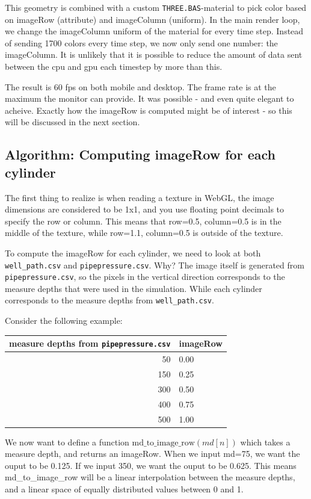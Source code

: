 This geometry is combined with a custom \texttt{THREE.BAS}-material to
pick color based on imageRow (attribute) and imageColumn (uniform). In
the main render loop, we change the imageColumn uniform of the material
for every time step. Instead of sending 1700 colors every time step, we
now only send one number: the imageColumn. It is unlikely that it is
possible to reduce the amount of data sent between the cpu and gpu each
timestep by more than this.

The result is 60 fps on both mobile and desktop. The frame rate is at
the maximum the monitor can provide. It was possible - and even quite
elegant to acheive. Exactly how the imageRow is computed might be of
interest - so this will be discussed in the next section.

\hypertarget{algorithm-computing-imagerow-for-each-cylinder}{%
\subsection{Algorithm: Computing imageRow for each
cylinder}\label{algorithm-computing-imagerow-for-each-cylinder}}

The first thing to realize is when reading a texture in WebGL, the image
dimensions are considered to be 1x1, and you use floating point decimals
to specify the row or column. This means that row=0.5, column=0.5 is in
the middle of the texture, while row=1.1, column=0.5 is outside of the
texture.

To compute the imageRow for each cylinder, we need to look at both
\texttt{well\_path.csv} and \texttt{pipepressure.csv}. Why? The image
itself is generated from \texttt{pipepressure.csv}, so the pixels in the
vertical direction corresponds to the measure depths that were used in
the simulation. While each cylinder corresponds to the measure depths
from \texttt{well\_path.csv}.

Consider the following example:

\begin{longtable}[]{@{}rl@{}}
\toprule
measure depths from \texttt{pipepressure.csv} & imageRow\tabularnewline
\midrule
\endhead
50 & 0.00\tabularnewline
150 & 0.25\tabularnewline
300 & 0.50\tabularnewline
400 & 0.75\tabularnewline
500 & 1.00\tabularnewline
\bottomrule
\end{longtable}

We now want to define a function \(\text{md\_to\_image\_row}(md[n])\)
which takes a measure depth, and returns an imageRow. When we input
md=75, we want the ouput to be 0.125. If we input 350, we want the ouput
to be 0.625. This means md\_to\_image\_row will be a linear
interpolation between the measure depths, and a linear space of equally
distributed values between 0 and 1.

